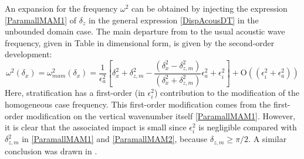 An expansion  for the frequency $\omega^2$ can be obtained by injecting the expression \ref{ParamallMAM1} of $\delta_z$ in the general expression \ref{DispAcousDT} in the unbounded domain case.
The main departure from to the usual acoustic wave frequency, given in Table  in dimensional form, is given by the second-order development:
\begin{equation}
	\label{ParamallMAM2}
	\omega^2(\delta_x) =\omega_{mam}^2(\delta_x)=
	\frac{1}{\epsilon_a^2}
	\left[	\delta_x^2+\delta_{z,m}^2-\frac{(\delta_x^2-\delta_{z,m}^2)}{(\delta_x^2+\delta_{z,m}^2)}\epsilon_a^2+
	\epsilon_i^2
	\right]
		+\mathrm{O}	((\epsilon_i^2+\epsilon_a^2))
\end{equation}
Here, stratification has a first-order (in $\epsilon_i^2$) contribution to the modification of the homogeneous case frequency. This first-order modification comes from the first-order modification on the vertical wavenumber itself \ref{ParamallMAM1}. However, it is clear that the associated impact is small since $\epsilon_i^2$ is negligible compared with $\delta_{z,m}^2$ in \ref{ParamallMAM1} and \ref{ParamallMAM2}, because $\delta_{z,m} \ge \pi/2$. A similar conclusion was drawn in \cite{smith_2015}.

